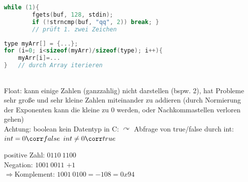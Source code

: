 \begin{multicols*}{3}
\begin{lstlisting}[language=C]
	while (1){
		fgets(buf, 128, stdin);
		if (!strncmp(buf, "qq", 2)) break; }	
		// prüft 1. zwei Zeichen
\end{lstlisting}
\HDRule[4pt]
\begin{lstlisting}[language=C]
type myArr[] = {...};
for (i=0; i<sizeof(myArr)/sizeof(type); i++){
	myArr[i]=...
}	// durch Array iterieren
\end{lstlisting}
\HRule[4pt]
\\
Float: kann einige Zahlen (ganzzahlig) nicht darstellen (bspw. 2), hat Probleme sehr große und sehr kleine Zahlen miteinander zu addieren (durch Normierung der Exponenten kann die kleine zu 0 werden, oder Nachkommastellen verloren gehen)\\
Achtung: boolean kein Datentyp in C: $\curvearrowright$ Abfrage von true/false durch int: 
$int=0\corr false$ \;
$int \not =0 \corr true$

positive Zahl: $0110 \: 1100$\\
Negation: $1001\: 0011$\; $+1$\\
$\Rightarrow$Komplement: $1001 \: 0100 = -108 = 0x94$


\end{multicols*}
